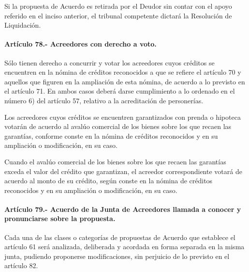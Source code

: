 \documentclass[
]{book}
\begin{document}
Si la propuesta de Acuerdo es retirada por el Deudor sin contar con el apoyo referido en el inciso anterior, el tribunal competente dictará la Resolución de Liquidación.

\hypertarget{artuxedculo-78.--acreedores-con-derecho-a-voto.}{%
\paragraph*{Artículo 78.- Acreedores con derecho a voto.}\label{artuxedculo-78.--acreedores-con-derecho-a-voto.}}

Sólo tienen derecho a concurrir y votar los acreedores cuyos créditos se encuentren en la nómina de créditos reconocidos a que se refiere el artículo 70 y aquellos que figuren en la ampliación de esta nómina, de acuerdo a lo previsto en el artículo 71. En ambos casos deberá darse cumplimiento a lo ordenado en el número 6) del artículo 57, relativo a la acreditación de personerías.

Los acreedores cuyos créditos se encuentren garantizados con prenda o hipoteca votarán de acuerdo al avalúo comercial de los bienes sobre los que recaen las garantías, conforme conste en la nómina de créditos reconocidos y en su ampliación o modificación, en su caso.

Cuando el avalúo comercial de los bienes sobre los que recaen las garantías exceda el valor del crédito que garantizan, el acreedor correspondiente votará de acuerdo al monto de su crédito, según conste en la nómina de créditos reconocidos y en su ampliación o modificación, en su caso.

\hypertarget{artuxedculo-79.--acuerdo-de-la-junta-de-acreedores-llamada-a-conocer-y-pronunciarse-sobre-la-propuesta.}{%
\paragraph*{Artículo 79.- Acuerdo de la Junta de Acreedores llamada a conocer y pronunciarse sobre la propuesta.}\label{artuxedculo-79.--acuerdo-de-la-junta-de-acreedores-llamada-a-conocer-y-pronunciarse-sobre-la-propuesta.}}

Cada una de las clases o categorías de propuestas de Acuerdo que establece el artículo 61 será analizada, deliberada y acordada en forma separada en la misma junta, pudiendo proponerse modificaciones, sin perjuicio de lo previsto en el artículo 82.
\end{document}
